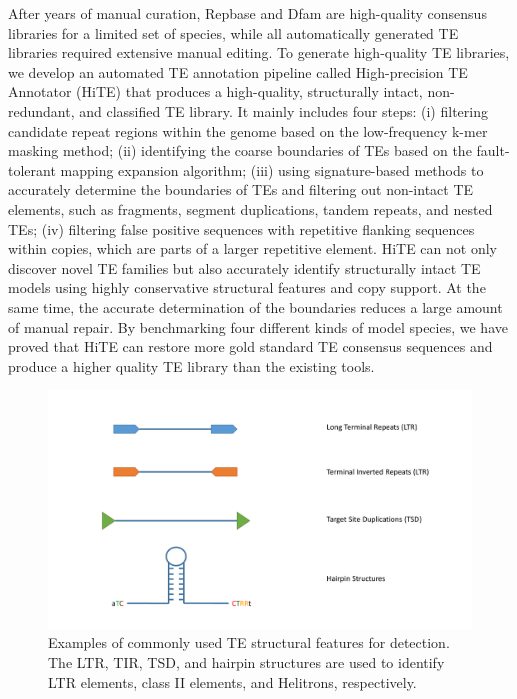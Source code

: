 \documentclass{bmcart}
\begin{document}
After years of manual curation, Repbase\cite{bao2015repbase} and Dfam\cite{hubley2016dfam} are high-quality consensus libraries for a limited set of species, while all automatically generated TE libraries required extensive manual editing. To generate high-quality TE libraries, we develop an automated TE annotation pipeline called High-precision TE Annotator (HiTE) that produces a high-quality, structurally intact, non-redundant, and classified TE library. It mainly includes four steps: (i) filtering candidate repeat regions within the genome based on the low-frequency k-mer masking method; (ii) identifying the coarse boundaries of TEs based on the fault-tolerant mapping expansion algorithm; (iii) using signature-based methods to accurately determine the boundaries of TEs and filtering out non-intact TE elements, such as fragments, segment duplications, tandem repeats, and nested TEs; (iv) filtering false positive sequences with repetitive flanking sequences within copies, which are parts of a larger repetitive element. HiTE can not only discover novel TE families but also accurately identify structurally intact TE models using highly conservative structural features and copy support. At the same time, the accurate determination of the boundaries reduces a large amount of manual repair. By benchmarking four different kinds of model species, we have proved that HiTE can restore more gold standard TE consensus sequences and produce a higher quality TE library than the existing tools.

\begin{figure}[h!]
	\centerline{\includegraphics[width=1.0\textwidth]{figures/TEStructures.pdf}}
	\caption{Examples of commonly used TE structural features for detection. The LTR, TIR, TSD, and hairpin structures are used to identify LTR elements, class II elements, and Helitrons, respectively.}
	\label{fig:TE_structures}
\end{figure}
\end{document}
